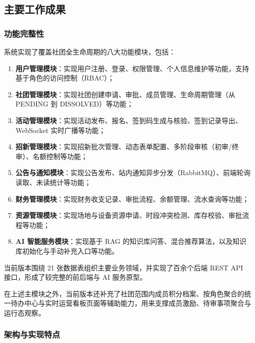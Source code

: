 \subsection{主要工作成果}

\subsubsection{功能完整性}

系统实现了覆盖社团全生命周期的八大功能模块，包括：

\begin{enumerate}
  \item \textbf{用户管理模块}：实现用户注册、登录、权限管理、个人信息维护等功能，支持基于角色的访问控制（RBAC）；
  \item \textbf{社团管理模块}：实现社团创建申请、审批、成员管理、生命周期管理（从 PENDING 到 DISSOLVED）等功能；
  \item \textbf{活动管理模块}：实现活动发布、报名、签到码生成与核验、签到记录导出、WebSocket 实时广播等功能；
  \item \textbf{招新管理模块}：实现招新批次管理、动态表单配置、多阶段审核（初审/终审）、名额控制等功能；
  \item \textbf{公告与通知模块}：实现公告发布、站内通知异步分发（RabbitMQ）、前端轮询读取、未读统计等功能；
  \item \textbf{财务管理模块}：实现财务收支记录、审批流程、余额管理、流水查询等功能；
  \item \textbf{资源管理模块}：实现场地与设备资源申请、时段冲突检测、库存校验、审批流程等功能；
  \item \textbf{AI 智能服务模块}：实现基于 RAG 的知识库问答、混合推荐算法，以及知识库初始化与手动补充入口等功能。
\end{enumerate}

当前版本围绕 21 张数据表组织主要业务领域，并实现了百余个后端 REST API 接口，形成了较完整的前后端与 AI 服务原型。

在上述主模块之外，当前版本还补充了社团范围内成员积分档案、按角色聚合的统一待办中心与实时运营看板页面等辅助能力，用来支撑成员激励、待审事项聚合与运行态观察。

\subsubsection{架构与实现特点}

